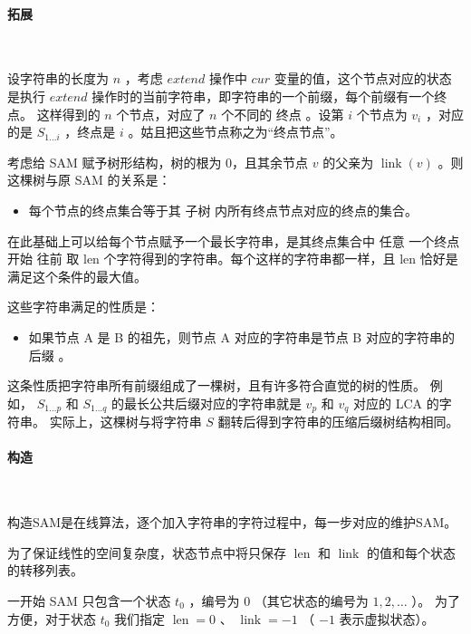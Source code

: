 \paragraph{拓展}~{}
\par
设字符串的长度为 $n$ ，考虑 $extend$ 操作中 $cur$ 变量的值，这个节点对应的状态是执行 $extend$ 操作时的当前字符串，即字符串的一个前缀，每个前缀有一个终点。
这样得到的 $n$ 个节点，对应了 $n$ 个不同的 终点 。设第 $i$ 个节点为 $v_i$ ，对应的是 $S_{1 \ldots i}$ ，终点是 $i$ 。姑且把这些节点称之为“终点节点”。\par

考虑给 SAM 赋予树形结构，树的根为 0，且其余节点 $v$ 的父亲为 $\operatorname{link}(v)$ 。则这棵树与原 SAM 的关系是：\par
\begin{itemize}
\item 每个节点的终点集合等于其 子树 内所有终点节点对应的终点的集合。\par
\end{itemize}
在此基础上可以给每个节点赋予一个最长字符串，是其终点集合中 任意 一个终点开始 往前 取 len 个字符得到的字符串。每个这样的字符串都一样，且 len 恰好是满足这个条件的最大值。\par

这些字符串满足的性质是：\par
\begin{itemize}
\item 如果节点 A 是 B 的祖先，则节点 A 对应的字符串是节点 B 对应的字符串的 后缀 。\par
\end{itemize}
这条性质把字符串所有前缀组成了一棵树，且有许多符合直觉的树的性质。
例如， $S_{1 \ldots p}$ 和 $S_{1 \ldots q}$ 的最长公共后缀对应的字符串就是 $v_p$ 和 $v_q$ 对应的 LCA 的字符串。
实际上，这棵树与将字符串 $S$ 翻转后得到字符串的压缩后缀树结构相同。\par

\paragraph{构造}~{}
\par
构造SAM是在线算法，逐个加入字符串的字符过程中，每一步对应的维护SAM。\par

为了保证线性的空间复杂度，状态节点中将只保存 $\operatorname{len}$ 和 $\operatorname{link}$ 的值和每个状态的转移列表。\par

一开始 SAM 只包含一个状态 $t_0$ ，编号为 $0$ （其它状态的编号为 $1,2,\ldots$ ）。
为了方便，对于状态 $t_0$ 我们指定 $\operatorname{len}=0$ 、 $\operatorname{link}=-1$ （ $-1$ 表示虚拟状态）。\par

